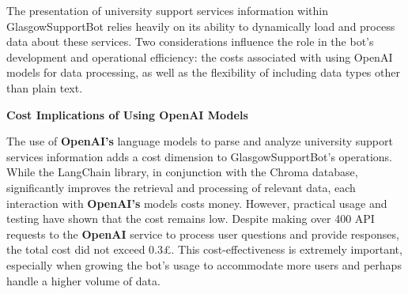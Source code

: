 \documentclass{l4proj}
\begin{document}
The presentation of university support services information within GlasgowSupportBot relies heavily on its ability to dynamically load and process data about these services. Two considerations influence the role in the bot's development and operational efficiency: the costs associated with using OpenAI models for data processing, as well as the flexibility of including data types other than plain text.

\textbf{Cost Implications of Using OpenAI Models}

The use of \textbf{OpenAI's} language models to parse and analyze university support services information adds a cost dimension to GlasgowSupportBot's operations. While the LangChain library, in conjunction with the Chroma database, significantly improves the retrieval and processing of relevant data, each interaction with \textbf{OpenAI's} models costs money. However, practical usage and testing have shown that the cost remains low. Despite making over 400 API requests to the \textbf{OpenAI} service to process user questions and provide responses, the total cost did not exceed 0.3£. This cost-effectiveness is extremely important, especially when growing the bot's usage to accommodate more users and perhaps handle a higher volume of data.
\end{document}
